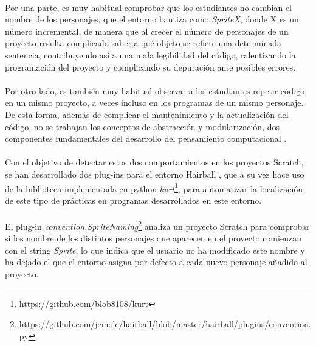 \documentclass[a4paper,10pt]{article}
\begin{document}
\paragraph{}Por una parte, es muy habitual comprobar que los estudiantes no cambian el nombre de los personajes, que el entorno bautiza como \textit{SpriteX}, donde X es un número incremental, de manera que al crecer el número de personajes de un proyecto resulta complicado saber a qué objeto se refiere una determinada sentencia, contribuyendo así a una mala legibilidad del código, ralentizando la programación del proyecto y complicando su depuración ante posibles errores.
\paragraph{}Por otro lado, es también muy habitual observar a los estudiantes repetir código en un mismo proyecto, a veces incluso en los programas de un mismo personaje. De esta forma, además de complicar el mantenimiento y la actualización del código, no se trabajan los conceptos de abstracción y modularización, dos componentes fundamentales del desarrollo del pensamiento computacional \cite{wing2008computational}.
\paragraph{}Con el objetivo de detectar estos dos comportamientos en los proyectos Scratch, se han desarrollado dos plug-ins para el entorno Hairball \cite{boe2013hairball}, que a su vez hace uso de la biblioteca implementada en python \textit{kurt}\footnote{https://github.com/blob8108/kurt}, para automatizar la localización de este tipo de prácticas en programas desarrollados en este entorno.
\paragraph{}El plug-in \textit{convention.SpriteNaming}\footnote{https://github.com/jemole/hairball/blob/master/hairball/plugins/convention.py} analiza un proyecto Scratch para comprobar si los nombre de los distintos personajes que aparecen en el proyecto comienzan con el string \textit{Sprite}, lo que indica que el usuario no ha modificado este nombre y ha dejado el que el entorno asigna por defecto a cada nuevo personaje añadido al proyecto.
\end{document}
